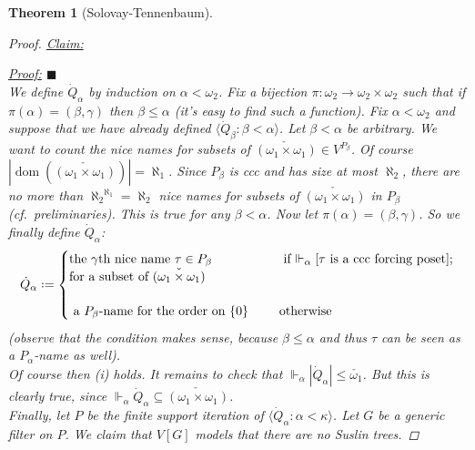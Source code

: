 \documentclass[11pt,a4paper]{report}
\newtheorem{theorem}{Theorem}[chapter] %
\theoremstyle{definition}
\theoremstyle{num.custom-title}
\theoremstyle{custom-title}
\newenvironment{claim}[1]{\par\noindent\underline{Claim#1:}\space}{} %
\newenvironment{claimproof}[1]{\par\noindent\underline{Proof:}\space#1}{\leavevmode\unskip\penalty9999 \hbox{}\nobreak\hfill\quad\hbox{$\blacksquare$}} %
\DeclareMathOperator{\dom}{dom}
\DeclareMathOperator{\sse}{\subseteq}
\newcommand*{\defeq}{\mathrel{\rlap{%
                     \raisebox{0.3ex}{$\cdot$}}%
                     \raisebox{-0.3ex}{$\cdot$}}%
                     =}
\newcommand{\forces}{\Vdash}
\begin{document}
\begin{theorem}[Solovay-Tennenbaum]
\begin{proof}
\begin{claim}{}
\begin{claimproof}
%
\end{claimproof}
\end{claim}\\[6pt]
%
We define $\dot{Q}_\alpha$ by induction on $\alpha < \omega_2$. Fix a bijection $\pi \colon \omega_2 \to \omega_2 \times \omega_2$ such that if $\pi(\alpha) = (\beta,\gamma)$ then $\beta \leq \alpha$ (it's easy to find such a function). Fix $\alpha < \omega_2$ and suppose that we have already defined $\langle \dot{Q}_\beta : \beta < \alpha \rangle$. 
Let $\beta < \alpha$ be arbitrary. We want to count the nice names for subsets of $\check{(\omega_1 \times \omega_1)} \in V^{P_\beta}$. Of course $|\dom(\check{(\omega_1 \times \omega_1)})| = \aleph_1$. Since $P_\beta$ is ccc and has size at most $\aleph_2$, there are no more than ${\aleph_2}^{\aleph_1} = \aleph_2$ nice names for subsets of $\check{(\omega_1 \times \omega_1)}$ in $P_\beta$ (cf.\ preliminaries). This is true for any $\beta < \alpha$. Now let $\pi(\alpha) = (\beta,\gamma)$.  So we finally define $\dot{Q}_\alpha$:
\[
\dot{Q}_\alpha \defeq
\begin{cases}
 \parbox[t]{.45\textwidth}{ the $\gamma$th nice name $\tau \in P_\beta$\\  for a subset of $\check{(\omega_1 \times \omega_1)}$} & \text{ if $\forces_\alpha [\tau$ is a ccc forcing poset$]$;} \\
  \\
 \text{ a $P_\beta$-name for the order on $\{0\}$ } & \text{otherwise}
\end{cases}
\]
(observe that the condition makes sense, because $\beta \leq \alpha$ and thus $\tau$ can be seen as a $P_\alpha$-name as well).\\
Of course then (i) holds. It remains to check that $\forces_\alpha |\dot{Q}_\alpha| \leq \check{\omega_1}$. But this is clearly true, since $\forces_\alpha \dot{Q}_\alpha \sse \check{(\omega_1 \times \omega_1)}$.\\
Finally, let $P$ be the finite support iteration of $\langle \dot{Q}_\alpha : \alpha < \kappa \rangle$. Let $G$ be a generic filter on $P$. We claim that $V[G]$ models that there are no Suslin trees. 


\end{proof}
\end{theorem}
\end{document}
